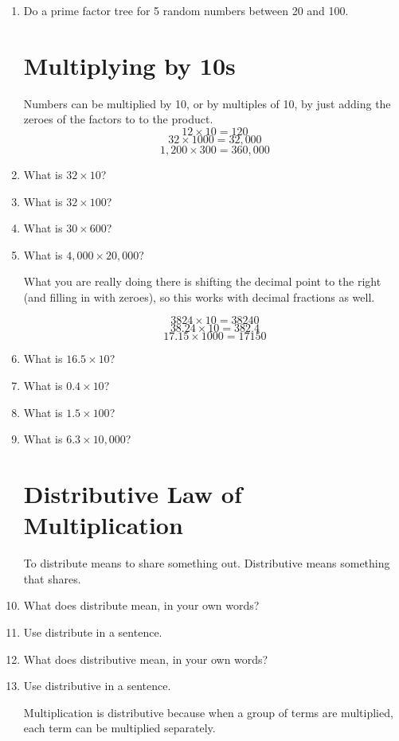 \documentclass[12pt]{article}
\begin{document}
\begin{enumerate}
\item Do a prime factor tree for 5 random numbers between 20 and 100.

\section*{Multiplying by 10s}

Numbers can be multiplied by 10, or by multiples of 10, by just adding the zeroes of the factors to to the product.\\

$$12 \times 10 = 120$$
$$32 \times 1000 = 32,000$$
$$1,200 \times 300 = 360,000$$

\item What is $32 \times 10$?
\item What is $32 \times 100$?
\item What is $30 \times 600$?
\item What is $4,000 \times 20,000$?

What you are really doing there is shifting the decimal point to the right (and filling in with zeroes), so this works with decimal fractions as well.

$$3824 \times 10 = 38240$$
$$38.24 \times 10 = 382.4$$
$$17.15 \times 1000 = 17150$$

\item What is $16.5 \times 10$?
\item What is $0.4 \times 10$?
\item What is $1.5 \times 100$?
\item What is $6.3 \times 10,000$?

\section*{Distributive Law of Multiplication}
To distribute means to share something out. Distributive means something that shares.\\

\item What does distribute mean, in your own words?
\item Use distribute in a sentence.
\item What does distributive mean, in your own words?
\item Use distributive in a sentence.

Multiplication is distributive because when a group of terms are multiplied, each term can be multiplied separately.\\


\end{enumerate}
\end{document}

